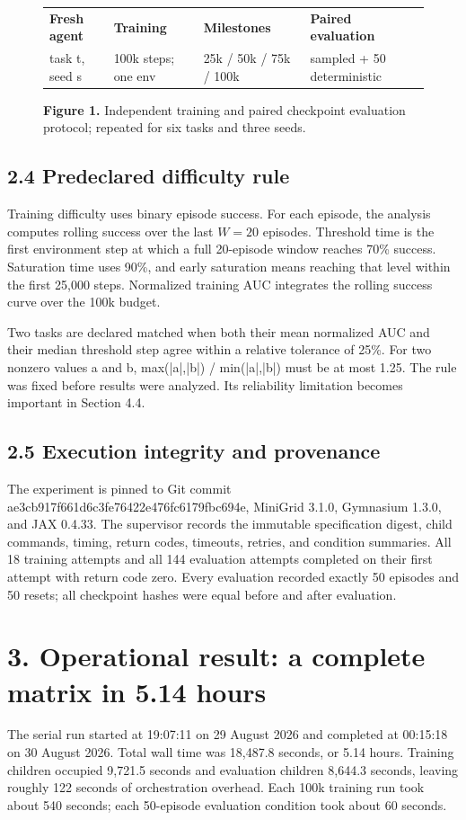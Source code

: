 \documentclass[10pt,a4paper]{article}
\newcommand{\reportsection}[1]{\section{#1}}
\newcommand{\reportsubsection}[1]{\subsection{\textcolor{brandblue}{#1}}}
\begin{document}
\begin{figure}[H]
\centering
\begingroup
\footnotesize
\setlength{\tabcolsep}{3.5pt}
\renewcommand{\arraystretch}{1.15}
\begin{tabularx}{\textwidth}{@{} >{\hsize=0.741\hsize\RaggedRight\arraybackslash}X >{\hsize=0.975\hsize\RaggedRight\arraybackslash}X >{\hsize=1.014\hsize\RaggedRight\arraybackslash}X >{\hsize=1.271\hsize\RaggedRight\arraybackslash}X @{}}
\rowcolor{brandblue}
\color{white}\textbf{Fresh agent} & \color{white}\textbf{Training} & \color{white}\textbf{Milestones} & \color{white}\textbf{Paired evaluation} \\
task t, seed s & 100k steps; one env & 25k / 50k / 75k / 100k & 50 sampled + 50 deterministic \\
\bottomrule
\end{tabularx}
\endgroup
\caption*{\textbf{Figure 1.} Independent training and paired checkpoint evaluation protocol; repeated for six tasks and three seeds.}
\end{figure}
\reportsubsection{2.4 Predeclared difficulty rule}
Training difficulty uses binary episode success. For each episode, the analysis computes rolling success over the last $W=20$ episodes. Threshold time is the first environment step at which a full 20-episode window reaches 70\% success. Saturation time uses 90\%, and early saturation means reaching that level within the first 25,000 steps. Normalized training AUC integrates the rolling success curve over the 100k budget.

Two tasks are declared matched when both their mean normalized AUC and their median threshold step agree within a relative tolerance of 25\%. For two nonzero values a and b, max(|a|,|b|) / min(|a|,|b|) must be at most 1.25. The rule was fixed before results were analyzed. Its reliability limitation becomes important in Section 4.4.

\reportsubsection{2.5 Execution integrity and provenance}
The experiment is pinned to Git commit ae3cb917f661d6c3fe76422e476fc6179fbc694e, MiniGrid 3.1.0, Gymnasium 1.3.0, and JAX 0.4.33. The supervisor records the immutable specification digest, child commands, timing, return codes, timeouts, retries, and condition summaries. All 18 training attempts and all 144 evaluation attempts completed on their first attempt with return code zero. Every evaluation recorded exactly 50 episodes and 50 resets; all checkpoint hashes were equal before and after evaluation.

\clearpage
\reportsection{3. Operational result: a complete matrix in 5.14 hours}
The serial run started at 19:07:11 on 29 August 2026 and completed at 00:15:18 on 30 August 2026. Total wall time was 18,487.8 seconds, or 5.14 hours. Training children occupied 9,721.5 seconds and evaluation children 8,644.3 seconds, leaving roughly 122 seconds of orchestration overhead. Each 100k training run took about 540 seconds; each 50-episode evaluation condition took about 60 seconds.
\end{document}
